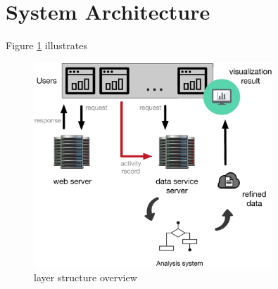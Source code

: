 \section{System Architecture}
Figure \ref{fig:sys-arch} illustrates

\begin{figure}[H]
    \centering
    \includegraphics[width = 0.8\textwidth]{fig/system-architecture-outline.eps}
    \caption{layer structure overview}
    \label{fig:sys-arch}
\end{figure}
